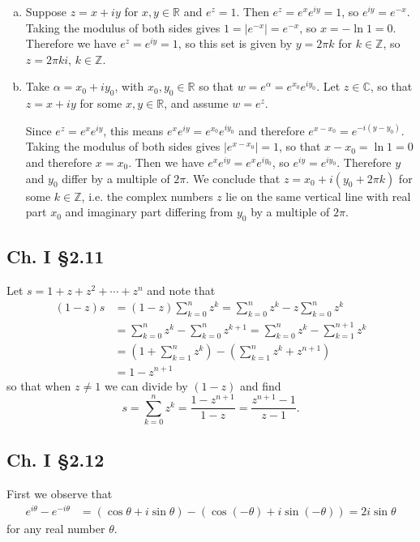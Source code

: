 \documentclass{article}
\begin{document}
\begin{enumerate}[(a)]
  \item{
    Suppose $z = x + iy$ for $x, y \in \mathbb{R}$ and $e^z = 1$. Then
    $e^z = e^x e^{iy} = 1$, so $e^{iy} = e^{-x}$. Taking the modulus of both sides
    gives $1 = |e^{-x}| = e^{-x}$, so $x = -\ln 1 = 0$. Therefore we have
    $e^z = e^{iy} = 1$, so this set is given by $y = 2 \pi k$ for $k \in \mathbb{Z}$,
    so $z = 2 \pi k i$, $k \in \mathbb{Z}$.
  }
  \item{
    Take $\alpha = x_0 + i y_0$, with $x_0, y_0 \in \mathbb{R}$
    so that $w = e^\alpha = e^{x_0} e^{iy_0}$.
    Let $z \in \mathbb{C}$, so that $z = x + iy$ for some
    $x, y \in \mathbb{R}$, and assume $w = e^z$.

    Since $e^z = e^x e^{iy}$, this means
    $e^x e^{iy} = e^{x_0} e^{iy_0}$ and therefore
    $e^{x - x_0} = e^{-i(y - y_0)}$. Taking the modulus of
    both sides gives $|e^{x - x_0}| = 1$, so that
    $x - x_0 = \ln 1 = 0$ and therefore $x = x_0$.
    Then we have $e^x e^{iy} = e^x e^{iy_0}$, so
    $e^{iy} = e^{iy_0}$. Therefore $y$ and $y_0$ differ by
    a multiple of $2\pi$. We conclude that
    $z = x_0 + i(y_0 + 2\pi k)$ for some $k \in \mathbb{Z}$,
    i.e. the complex numbers $z$ lie on the same vertical line
    with real part $x_0$ and imaginary part differing from $y_0$
    by a multiple of $2\pi$.
  }
\end{enumerate}


\subsection*{Ch. I \S 2.11}
Let $s = 1 + z + z^2 + \cdots + z^n$ and note that
\begin{align*}
   (1 - z)s
&= (1 - z)\sum_{k=0}^n z^k
 = \sum_{k=0}^n z^k - z\sum_{k=0}^n z^k \\
&= \sum_{k=0}^n z^k - \sum_{k=0}^n z^{k+1}
 = \sum_{k=0}^n z^k - \sum_{k=1}^{n+1} z^{k} \\
&= \left(1 + \sum_{k=1}^n z^k\right) - \left(\sum_{k=1}^n z^k +
  z^{n+1}\right) \\
&= 1 - z^{n+1}
\end{align*}
so that when $z \neq 1$ we can divide by $(1 - z)$ and find
$$
  s
= \sum_{k=0}^n z^k = \frac{1 - z^{n+1}}{1 - z}
= \frac{z^{n+1} - 1}{z - 1}.
$$

\subsection*{Ch. I \S 2.12}
First we observe that
\begin{align*}
    e^{i \theta} - e^{-i \theta}
&= (\cos \theta + i \sin \theta) - (\cos(-\theta) + i \sin(-\theta))
 = 2i \sin \theta
\end{align*}
for any real number $\theta$.
\end{document}
